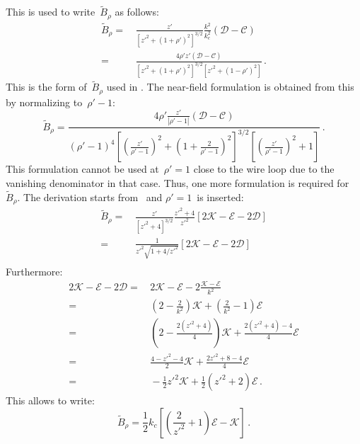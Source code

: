 This is used to write~$\tilde{B}_\rho$ as follows:
\begin{align}
  \tilde{B}_\rho
 =&\, \frac{z'}{\left[ z'^2 + (1 + \rho')^2 \right]^{3/2}} \frac{k^2}{k_c^2} \left(  \mathcal{D} - \mathcal{C} \right) \nonumber \\
 =&\, \frac{4 \rho' z' \left(  \mathcal{D} - \mathcal{C} \right) }{\left[ z'^2 + (1 + \rho')^2 \right]^{3/2} \left[ z'^2 + (1 - \rho')^2 \right]} \, .
\end{align}
This is the form of~$\tilde{B}_\rho$ used in .
The near-field formulation is obtained from this by normalizing to~$\rho'-1$:
\begin{equation}
  \tilde{B}_\rho
 = \frac{4 \rho' \frac{z'}{|\rho'-1|} \left( \mathcal{D} - \mathcal{C} \right) }
        {(\rho'-1)^4 \left[ \left(\frac{z'}{\rho'-1}\right)^2 + \left(1 + \frac{2}{\rho'-1}\right)^2 \right]^{3/2}
                     \left[ \left(\frac{z'}{\rho'-1}\right)^2 + 1 \right]} \, .
\end{equation}
This formulation cannot be used at~$\rho'=1$ close to the wire loop
due to the vanishing denominator in that case.
Thus, one more formulation is required for~$\tilde{B}_\rho$.
The derivation starts from~ and $\rho'=1$~is inserted:
\begin{align}
  \tilde{B}_\rho
 =&\, \frac{z'}{\left[ z'^2 + 4 \right]^{3/2}} \frac{z'^2 + 4}{z'^2} \left[ 2 \mathcal{K} - \mathcal{E} - 2 \mathcal{D} \right] \nonumber \\
 =&\, \frac{1}{z'^2 \sqrt{1 + 4/z'^2}} \left[ 2 \mathcal{K} - \mathcal{E} - 2 \mathcal{D} \right] \nonumber \\
\end{align}
Furthermore:
\begin{align}
      2 \mathcal{K} - \mathcal{E} - 2 \mathcal{D}
 =&\, 2 \mathcal{K} - \mathcal{E} - 2 \frac{\mathcal{K} - \mathcal{E}}{k^2} \nonumber \\
 =&\, \left( 2 - \frac{2}{k^2} \right) \mathcal{K} + \left( \frac{2}{k^2} - 1 \right) \mathcal{E} \nonumber \\
 =&\, \left( 2 - \frac{2(z'^2+4)}{4} \right) \mathcal{K} + \frac{2(z'^2+4) - 4}{4} \mathcal{E} \nonumber \\
 =&\, \frac{4 - z'^2 -4}{2} \mathcal{K} + \frac{2 z'^2 + 8 - 4}{4} \mathcal{E} \nonumber \\
 =&\, -\frac{1}{2} z'^2 \mathcal{K} + \frac{1}{2}\left(z'^2 +2\right) \mathcal{E} \, .
\end{align}
This allows to write:
\begin{equation}
 \tilde{B}_\rho = \frac{1}{2} k_c \left[ \left( \frac{2}{z'^2} + 1 \right) \mathcal{E} - \mathcal{K} \right] \, .
\end{equation}
